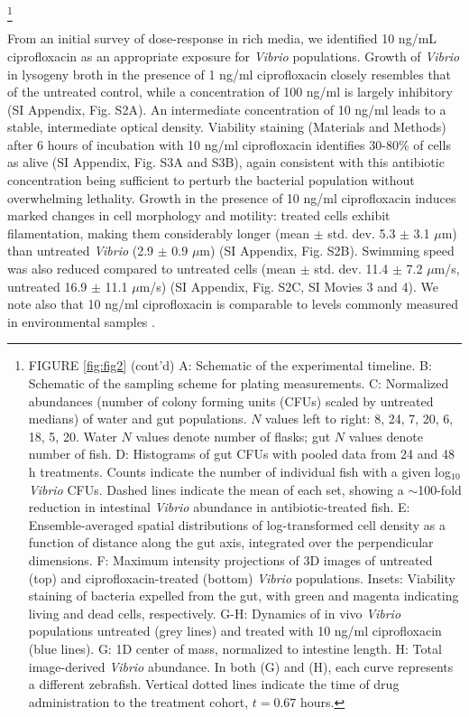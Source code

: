 {\let\thefootnote\relax\footnote{FIGURE \ref{fig:fig2} (cont'd) A: Schematic of the experimental timeline. B: Schematic of the sampling scheme for plating measurements. C: Normalized abundances (number of colony forming units (CFUs) scaled by untreated medians) of water and gut populations. $N$ values left to right: 8, 24, 7, 20, 6, 18, 5, 20. Water $N$ values denote number of flasks; gut $N$ values denote number of fish. D: Histograms of gut CFUs with pooled data from 24 and 48 h treatments. Counts indicate the number of individual fish with a given log$_{10}$ \textit{Vibrio} CFUs. Dashed lines indicate the mean of each set, showing a $\sim$100-fold reduction in intestinal \textit{Vibrio} abundance in antibiotic-treated fish. E: Ensemble-averaged spatial distributions of log-transformed cell density as a function of distance along the gut axis, integrated over the perpendicular dimensions. F: Maximum intensity projections of 3D images of untreated (top) and ciprofloxacin-treated (bottom) \textit{Vibrio} populations. Insets: Viability staining of bacteria expelled from the gut, with green and magenta indicating living and dead cells, respectively. G-H: Dynamics of in vivo \textit{Vibrio} populations untreated (grey lines) and treated with 10 ng/ml ciprofloxacin (blue lines). G: 1D center of mass, normalized to intestine length. H: Total image-derived \textit{Vibrio} abundance. In both (G) and (H), each curve represents a different zebrafish. Vertical dotted lines indicate the time of drug administration to the treatment cohort, $t = 0.67$ hours.}}

From an initial survey of dose-response in rich media, we identified 10 ng/mL ciprofloxacin as an appropriate exposure for \textit{Vibrio} populations. Growth of \textit{Vibrio} in lysogeny broth in the presence of 1 ng/ml ciprofloxacin closely resembles that of the untreated control, while a concentration of 100 ng/ml is largely inhibitory (SI Appendix, Fig. S2A). An intermediate concentration of 10 ng/ml leads to a stable, intermediate optical density. Viability staining (Materials and Methods) after 6 hours of incubation with 10 ng/ml ciprofloxacin identifies 30-80\% of cells as alive (SI Appendix, Fig. S3A and S3B), again consistent with this antibiotic concentration being sufficient to perturb the bacterial population without overwhelming lethality. Growth in the presence of 10 ng/ml ciprofloxacin induces marked changes in cell morphology and motility: treated cells exhibit filamentation, making them considerably longer (mean $\pm$ std. dev. 5.3 $\pm$ 3.1 $\mu$m) than untreated \textit{Vibrio} (2.9 $\pm$ 0.9 $\mu$m) (SI Appendix, Fig. S2B). Swimming speed was also reduced compared to untreated cells (mean $\pm$ std. dev. 11.4 $\pm$ 7.2 $\mu$m/s, untreated  16.9 $\pm$ 11.1 $\mu$m/s) (SI Appendix, Fig. S2C, SI Movies 3 and 4). We note also that 10 ng/ml ciprofloxacin is comparable to levels commonly measured in environmental samples \cite{girardi2011biodegradation}. 



